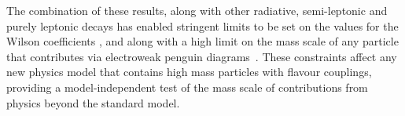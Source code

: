 The combination of these results, along with other radiative,
semi-leptonic and purely leptonic decays has enabled stringent limits to be set on the 
values for the Wilson coefficients ,  and  along with 
a high limit on the mass scale of any particle that contributes via
electroweak penguin diagrams~\cite{Bobeth:2011nj,Altmannshofer:2011gn,Altmannshofer:2012az}.
These constraints affect any new physics model that contains high mass particles with flavour couplings, 
providing a model-independent test of the mass scale of contributions from physics beyond the standard model.









